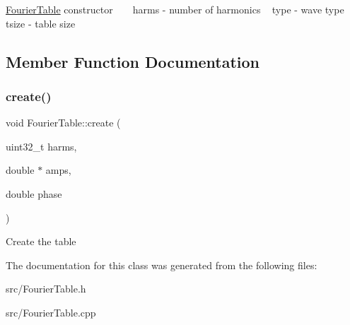 \hyperlink{class_fourier_table}{Fourier\+Table} constructor ~\newline
~\newline
harms -\/ number of harmonics ~\newline
type -\/ wave type ~\newline
tsize -\/ table size ~\newline


\subsection{Member Function Documentation}
\mbox{\label{class_fourier_table_af1c940238cc8e2c9bdd7f77c3ada9867}} 
\subsubsection{\texorpdfstring{create()}{create()}}
{\footnotesize\ttfamily void Fourier\+Table\+::create (\begin{DoxyParamCaption}\item[{uint32\+\_\+t}]{harms,  }\item[{double $\ast$}]{amps,  }\item[{double}]{phase }\end{DoxyParamCaption})\hspace{0.3cm}{\ttfamily [protected]}}

Create the table 

The documentation for this class was generated from the following files\+:\begin{DoxyCompactItemize}
\item 
src/Fourier\+Table.\+h\item 
src/Fourier\+Table.\+cpp\end{DoxyCompactItemize}
